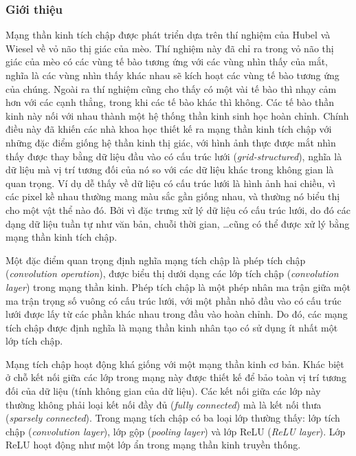 \subsubsection{Giới thiệu}
Mạng thần kinh tích chập được phát triển dựa trên thí nghiệm của Hubel và Wiesel về vỏ não thị giác của mèo. Thí nghiệm này đã chỉ ra trong vỏ não thị giác của mèo có các vùng tế bào tương ứng với các vùng nhìn thấy của mắt, nghĩa là các vùng nhìn thấy khác nhau sẽ kích hoạt các vùng tế bào tương ứng của chúng. Ngoài ra thí nghiệm cũng cho thấy có một vài tế bào thì nhạy cảm hơn với các cạnh thẳng, trong khi các tế bào khác thì không. Các tế bào thần kinh này nối với nhau thành một hệ thống thần kinh sinh học hoàn chỉnh. Chính điều này đã khiến các nhà khoa học thiết kế ra mạng thần kinh tích chập với những đặc điểm giống hệ thần kinh thị giác, với hình ảnh thực được mắt nhìn thấy được thay bằng dữ liệu đầu vào có cấu trúc lưới (\textit{grid-structured}), nghĩa là dữ liệu mà vị trí tương đối của nó so với các dữ liệu khác trong không gian là quan trọng. Ví dụ dễ thấy về dữ liệu có cấu trúc lưới là hình ảnh hai chiều, vì các pixel kề nhau thường mang màu sắc gần giống nhau, và thường nó biểu thị cho một vật thể nào đó. Bởi vì đặc trưng xử lý dữ liệu có cấu trúc lưới, do đó các dạng dữ liệu tuần tự như văn bản, chuỗi thời gian, \dots cũng có thể được xử lý bằng mạng thần kinh tích chập.\cite{Aggarwal2023}

Một đặc điểm quan trọng định nghĩa mạng tích chập là phép tích chập (\textit{convolution operation}), được biểu thị dưới dạng các lớp tích chập (\textit{convolution layer}) trong mạng thần kinh. Phép tích chập là một phép nhân ma trận giữa một ma trận trọng số vuông có cấu trúc lưới, với một phần nhỏ đầu vào có cấu trúc lưới được lấy từ các phần khác nhau trong đầu vào hoàn chỉnh. Do đó, các mạng tích chập được định nghĩa là mạng thần kinh nhân tạo có sử dụng ít nhất một lớp tích chập.

Mạng tích chập hoạt động khá giống với một mạng thần kinh cơ bản. Khác biệt ở chỗ kết nối giữa các lớp trong mạng này được thiết kế để bảo toàn vị trí tương đối của dữ liệu (tính không gian của dữ liệu). Các kết nối giữa các lớp này thường không phải loại kết nối đầy đủ (\textit{fully connected}) mà là kết nối thưa (\textit{sparsely connected}). Trong mạng tích chập có ba loại lớp thường thấy: lớp tích chập (\textit{convolution layer}), lớp gộp (\textit{pooling layer}) và lớp ReLU (\textit{ReLU layer}). Lớp ReLU hoạt động như một lớp ẩn trong mạng thần kinh truyền thống.

